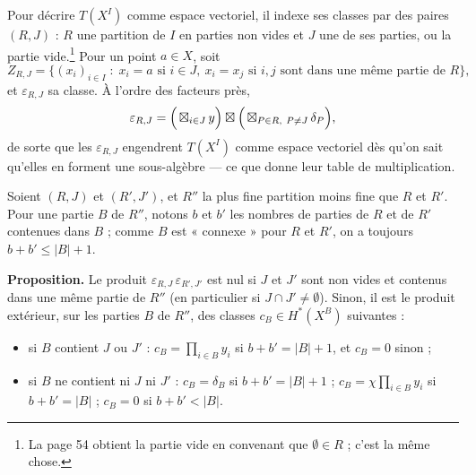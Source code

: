 \documentclass[11pt,a4paper]{article}
\begin{document}
Pour décrire $T(X^{I})$ comme espace vectoriel, il indexe ses classes par des
paires $(R, J)$ : $R$ une partition de $I$ en parties non vides et $J$ une de
ses parties, ou la partie vide.\footnote{La page 54 obtient la partie vide en
convenant que $\emptyset \in R$ ; c'est la même chose.} Pour un point
$a \in X$, soit
\[ Z_{R,J} = \bigl\{ (x_{i})_{i \in I} \;:\; x_{i} = a \text{ si } i \in J , \ x_{i} = x_{j} \text{ si } i, j \text{ sont dans une même partie de } R \bigr\} , \]
et $\varepsilon_{R,J}$ sa classe. À l'ordre des facteurs près,
\[ \varepsilon_{R,J} = \Bigl(\,\boxtimes_{i \in J}\, y\Bigr) \boxtimes \Bigl(\,\boxtimes_{P \in R,\ P \neq J}\, \delta_{P}\Bigr) , \]
de sorte que les $\varepsilon_{R,J}$ engendrent $T(X^{I})$ comme espace
vectoriel dès qu'on sait qu'elles en forment une sous-algèbre --- ce que
donne leur table de multiplication.

Soient $(R, J)$ et $(R', J')$, et $R''$ la plus fine partition moins fine que
$R$ et $R'$. Pour une partie $B$ de $R''$, notons $b$ et $b'$ les nombres de
parties de $R$ et de $R'$ contenues dans $B$ ; comme $B$ est « connexe » pour
$R$ et $R'$, on a toujours $b + b' \leq |B| + 1$.

\textbf{Proposition.} Le produit $\varepsilon_{R,J}\,\varepsilon_{R',J'}$ est
nul si $J$ et $J'$ sont non vides et contenus dans une même partie de $R''$
(en particulier si $J \cap J' \neq \emptyset$). Sinon, il est le produit
extérieur, sur les parties $B$ de $R''$, des classes $c_{B} \in H^{*}(X^{B})$
suivantes :
\begin{itemize}
  \item si $B$ contient $J$ ou $J'$ : $c_{B} = \prod_{i \in B} y_{i}$ si
  $b + b' = |B| + 1$, et $c_{B} = 0$ sinon ;
  \item si $B$ ne contient ni $J$ ni $J'$ : $c_{B} = \delta_{B}$ si
  $b + b' = |B| + 1$ ; $c_{B} = \chi \prod_{i \in B} y_{i}$ si
  $b + b' = |B|$ ; $c_{B} = 0$ si $b + b' < |B|$.
\end{itemize}
\end{document}
